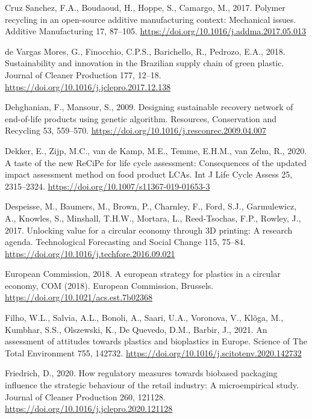 \documentclass[12pt]{elsarticle} %
\newlength{\cslhangindent}
\newlength{\cslentryspacingunit} %
\newenvironment{CSLReferences}[2] %
 {%
  \setlength{\parindent}{0pt}
  \ifodd #1
  \let\oldpar\par
  \def\par{\hangindent=\cslhangindent\oldpar}
  \fi
  \setlength{\parskip}{#2\cslentryspacingunit}
 }%
 {}
\begin{document}
\begin{CSLReferences}{1}{0}
\leavevmode{}%
Cruz Sanchez, F.A., Boudaoud, H., Hoppe, S., Camargo, M., 2017. Polymer recycling in an open-source additive manufacturing context: {Mechanical} issues. Additive Manufacturing 17, 87--105. \url{https://doi.org/10.1016/j.addma.2017.05.013}

\leavevmode{}%
de Vargas Mores, G., Finocchio, C.P.S., Barichello, R., Pedrozo, E.A., 2018. Sustainability and innovation in the {Brazilian} supply chain of green plastic. Journal of Cleaner Production 177, 12--18. \url{https://doi.org/10.1016/j.jclepro.2017.12.138}

\leavevmode{}%
Dehghanian, F., Mansour, S., 2009. Designing sustainable recovery network of end-of-life products using genetic algorithm. Resources, Conservation and Recycling 53, 559--570. \url{https://doi.org/10.1016/j.resconrec.2009.04.007}

\leavevmode{}%
Dekker, E., Zijp, M.C., van de Kamp, M.E., Temme, E.H.M., van Zelm, R., 2020. A taste of the new {ReCiPe} for life cycle assessment: Consequences of the updated impact assessment method on food product {LCAs}. Int J Life Cycle Assess 25, 2315--2324. \url{https://doi.org/10.1007/s11367-019-01653-3}

\leavevmode{}%
Despeisse, M., Baumers, M., Brown, P., Charnley, F., Ford, S.J., Garmulewicz, A., Knowles, S., Minshall, T.H.W., Mortara, L., Reed-Tsochas, F.P., Rowley, J., 2017. Unlocking value for a circular economy through {3D} printing: {A} research agenda. Technological Forecasting and Social Change 115, 75--84. \url{https://doi.org/10.1016/j.techfore.2016.09.021}

\leavevmode{}%
European Commission, 2018. A european strategy for plastics in a circular economy, COM (2018). {European Commission}, {Brussels}. \url{https://doi.org/10.1021/acs.est.7b02368}

\leavevmode{}%
Filho, W.L., Salvia, A.L., Bonoli, A., Saari, U.A., Voronova, V., Klõga, M., Kumbhar, S.S., Olszewski, K., De Quevedo, D.M., Barbir, J., 2021. An assessment of attitudes towards plastics and bioplastics in {Europe}. Science of The Total Environment 755, 142732. \url{https://doi.org/10.1016/j.scitotenv.2020.142732}

\leavevmode{}%
Friedrich, D., 2020. How regulatory measures towards biobased packaging influence the strategic behaviour of the retail industry: {A} microempirical study. Journal of Cleaner Production 260, 121128. \url{https://doi.org/10.1016/j.jclepro.2020.121128}


\end{CSLReferences}
\end{document}
